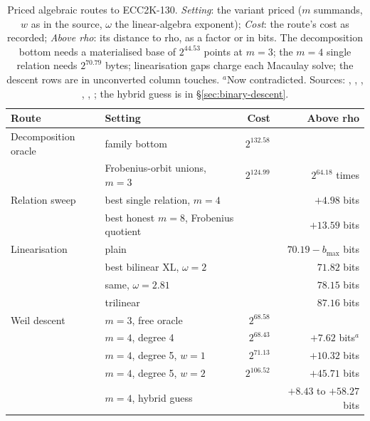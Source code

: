 \begin{table}[t]
\centering\small
\begin{tabular}{@{}llrr@{}}
\toprule
Route & Setting & Cost & Above rho \\
\midrule
Decomposition oracle & family bottom & $2^{132.58}$ & \\
 & Frobenius-orbit unions, $m=3$ & $2^{124.99}$ & $2^{64.18}$ times \\
\addlinespace
Relation sweep & best single relation, $m=4$ & & $+4.98$ bits \\
 & best honest $m=8$, Frobenius quotient & & $+13.59$ bits \\
\addlinespace
Linearisation & plain & & $70.19-b_{\max}$ bits \\
 & best bilinear XL, $\omega=2$ & & $71.82$ bits \\
 & same, $\omega=2.81$ & & $78.15$ bits \\
 & trilinear & & $87.16$ bits \\
\addlinespace
Weil descent & $m=3$, free oracle & $2^{68.58}$ & \\
 & $m=4$, degree 4 & $2^{68.43}$ & $+7.62$ bits$^{a}$ \\
 & $m=4$, degree 5, $w=1$ & $2^{71.13}$ & $+10.32$ bits \\
 & $m=4$, degree 5, $w=2$ & $2^{106.52}$ & $+45.71$ bits \\
 & $m=4$, hybrid guess & & $+8.43$ to $+58.27$ bits \\
\bottomrule
\end{tabular}
\caption[]{Priced algebraic routes to ECC2K-130. \emph{Setting}: the
variant priced ($m$ summands, $w$ as in the source, $\omega$ the
linear-algebra exponent); \emph{Cost}: the route's cost as recorded;
\emph{Above rho}: its distance to rho, as a factor or in bits. The
decomposition bottom needs a materialised base of $2^{44.53}$ points at
$m=3$; the $m=4$ single relation needs $2^{70.79}$ bytes; linearisation
gaps charge each Macaulay solve; the descent rows are in unconverted column
touches. $^{a}$Now contradicted. Sources:
,
,
,
,
,
; the
hybrid guess is in \S\ref{sec:binary-descent}.}
\label{tab:prog_koblitz-ecc2k130}
\end{table}

